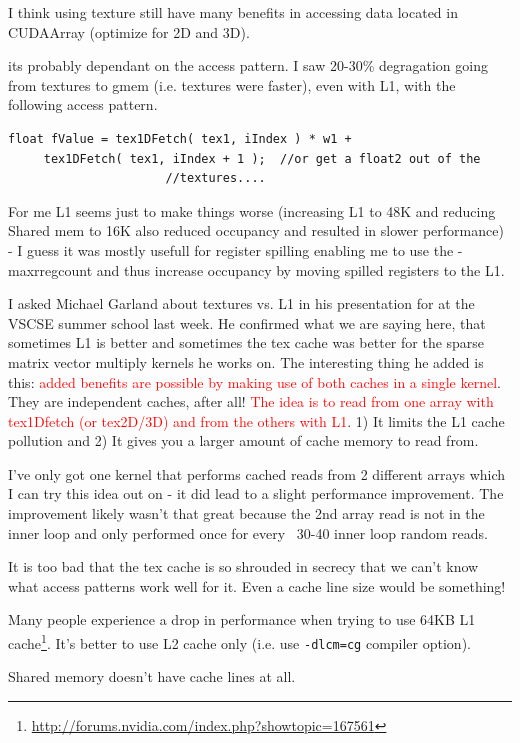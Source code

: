 I think using texture still have many benefits in accessing data
located in CUDAArray (optimize for 2D and 3D).

its probably dependant on the access pattern.  I saw 20-30\%
degragation going from textures to gmem (i.e. textures were faster),
even with L1, with the following access pattern.
\begin{lstlisting}
float fValue = tex1DFetch( tex1, iIndex ) * w1 + 
     tex1DFetch( tex1, iIndex + 1 );  //or get a float2 out of the
                      //textures.... 

\end{lstlisting}
For me L1 seems just to make things worse (increasing L1 to 48K and
reducing Shared mem to 16K also reduced occupancy and resulted in
slower performance) - I guess it was mostly usefull for register
spilling enabling me to use the -maxrregcount and thus increase
occupancy by moving spilled registers to the L1.


I asked Michael Garland about textures vs. L1 in his presentation for
at the VSCSE summer school last week. He confirmed what we are saying
here, that sometimes L1 is better and sometimes the tex cache was
better for the sparse matrix vector multiply kernels he works on. The
interesting thing he added is this:
\textcolor{red}{added benefits are possible by making use of both
  caches in a single kernel}.
They are independent caches, after all!
\textcolor{red}{The idea is to read from one array with tex1Dfetch (or
  tex2D/3D) and from the others with L1}.
1) It limits the L1 cache pollution and 2) It gives you a larger
amount of cache memory to read from.

I've only got one kernel that performs cached reads from 2 different
arrays which I can try this idea out on - it did lead to a slight
performance improvement. The improvement likely wasn't that great
because the 2nd array read is not in the inner loop and only performed
once for every ~30-40 inner loop random reads.

It is too bad that the tex cache is so shrouded in secrecy that we
can't know what access patterns work well for it. Even a cache line
size would be something! 

Many people experience a drop in performance when trying to use 64KB
L1
cache\footnote{\url{http://forums.nvidia.com/index.php?showtopic=167561}}.
It's better to use L2 cache only (i.e. use \verb!-dlcm=cg! compiler
option). 

Shared memory doesn't have cache lines at all.


